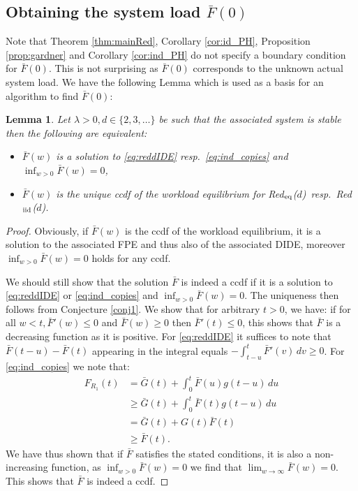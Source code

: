 \documentclass[12pt]{report}
\newcommand{\Redid}{Red$_{\textup{eq}}$($d$)}
\newcommand{\Redind}{Red$_{\textup{iid}}$($d$)}
\newtheorem{lemma}[theorem]{Lemma}
\begin{document}
\subsection*{Obtaining the system load $\bar F(0)$}
Note that Theorem \ref{thm:mainRed}, Corollary \ref{cor:id_PH}, Proposition \ref{prop:gardner} and Corollary \ref{cor:ind_PH} do not specify a boundary condition for $\bar F(0)$. This is not surprising as $\bar F(0)$ corresponds to the unknown actual system load. We have the following Lemma which is used as a basis for an algorithm to find $\bar F(0)$:
\begin{lemma}\label{lem:numerical}
Let $\lambda > 0, d \in \{2,3,\dots\}$ be such that the associated system is stable then the following are equivalent:
\begin{itemize}
\item $\bar F(w)$ is a solution to \eqref{eq:reddIDE} resp.~\eqref{eq:ind_copies} and $\inf_{w>0} \bar F(w) = 0$,
\item $\bar F(w)$ is the unique ccdf of the workload equilibrium for \Redid\ resp.~\Redind.
\end{itemize}
\end{lemma}
\begin{proof}
Obviously, if $\bar F(w)$ is the ccdf of the workload equilibrium, it is a solution to the associated FPE and thus also of the associated DIDE, moreover $\inf_{w>0} \bar F(w)=0$ holds for any ccdf.

We should still show that the solution $\bar F$ is indeed a ccdf if it is a solution to \eqref{eq:reddIDE} or \eqref{eq:ind_copies} and $\inf_{w>0} \bar F(w) = 0$. The uniqueness then follows from Conjecture \ref{conj1}.  We show that for arbitrary $t>0$, we have: if for all $w<t, \bar F'(w) \leq 0$ and $\bar F (w) \geq 0$ then $\bar F'(t) \leq 0$, this shows that $\bar F$ is a decreasing function as it is positive. For \eqref{eq:reddIDE} it suffices to note that $\bar F(t-u) - \bar F(t)$ appearing in the integral equals $- \int_{t-u}^t \bar F'(v)\, dv \geq 0$. For \eqref{eq:ind_copies} we note that:
\begin{align*}
F_{R_1}(t)
&= \bar G(t) + \int_0^t \bar F(u) g(t-u) \, du\\
&\geq \bar G(t) + \int_0^t \bar F(t) g(t-u) \, du\\
&= \bar G(t) + G(t) \bar F(t)\\
&\geq \bar F(t).
\end{align*} 
We have thus shown that if $\bar F$ satisfies the stated conditions, it is also a non-increasing function, as $\inf_{w>0} \bar F(w)=0$ we find that $\lim_{w\rightarrow \infty} \bar F(w)=0$. This shows that $\bar F$ is indeed a ccdf.
\end{proof}
\end{document}

